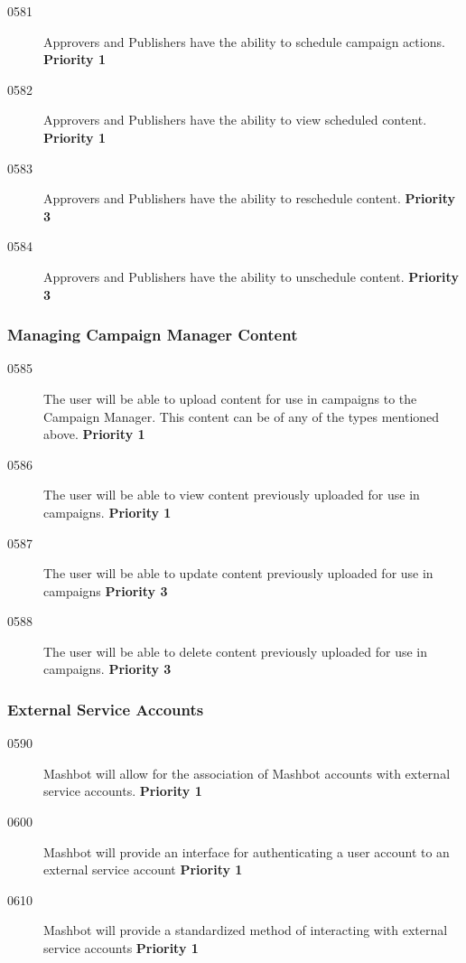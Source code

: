 \documentclass{article}
\begin{document}
\begin{description}
\begin{description}
\item[0581] Approvers and Publishers have the ability to schedule
  campaign actions. \textbf{Priority 1}
\item[0582] Approvers and Publishers have the ability to view
  scheduled content. \textbf{Priority 1}
\item[0583] Approvers and Publishers have the ability to reschedule
  content. \textbf{Priority 3}
\item[0584] Approvers and Publishers have the ability to unschedule
  content. \textbf{Priority 3}

\end{description}
\end{description}
\subsubsection{Managing Campaign Manager Content}

\begin{description}
\item[0585] The user will be able to upload content for use in
  campaigns to the Campaign Manager. This content can be of any of the
  types mentioned above. \textbf{Priority 1}
\item[0586] The user will be able to view content previously uploaded
  for use in campaigns. \textbf{Priority 1}
\item[0587] The user will be able to update content previously
  uploaded for use in campaigns \textbf{Priority 3}
\item[0588] The user will be able to delete content previously
  uploaded for use in campaigns. \textbf{Priority 3}

\end{description}

\subsubsection{External Service Accounts} %

\begin{description}
\item[0590] Mashbot will allow for the association of Mashbot accounts with
  external service accounts. \textbf{Priority 1}
\item[0600] Mashbot will provide an interface for authenticating a user
  account to an external service account \textbf{Priority 1}
\item[0610] Mashbot will provide a standardized method of interacting with
  external service accounts \textbf{Priority 1}
\end{description}
\end{document}
